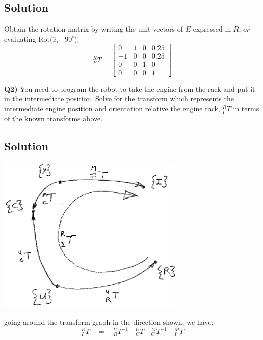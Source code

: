 \begin{ExampleCont}
\subsection*{Solution}

Obtain the rotation matrix by writing the unit vectors of {$E$} expressed in {$R$}, $or$ evaluating Rot($\hat{z},-90^{\circ}$).
\[
{^R_ET} =
\begin{bmatrix}
0 & 1 & 0 & 0.25	\\
-1 & 0 & 0 & 0.25	\\
0 & 0 & 1 & 0		\\
0 & 0 & 0 & 1
\end{bmatrix}
\]

{\bf Q2)} You need to program the robot to take the engine from the rack and put it in the intermediate position.  Solve for the transform which represents the intermediate engine position and orientation relative the engine rack, $^R_IT$ in terms of the known transforms above.

\subsection*{Solution}
\includegraphics[width=3.5in]{figs02/00440.eps}

going around the transform graph in the direction shown, we have:
\[
{^R_IT} \quad = \quad {^U_RT^{-1}} \quad {^U_CT} \quad {^M_CT^{-1}} \quad {^M_IT}
\]
\end{ExampleCont}



